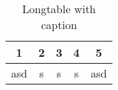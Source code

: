 \documentclass[tablecaptionabove]{scrartcl}
\begin{document}
\begin{longtable}{c|c|c|c|c}
\caption[Longtable]{Longtable with caption}\\
\hline
1 & 2 & 3 & 4 & 5\tabularnewline
\hline
asd & s & s & s & asd\tabularnewline
\hline
\end{longtable}
\end{document}
